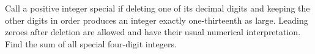 Call a positive integer special if deleting one of its decimal digits and keeping the other digits in order produces an integer exactly one-thirteenth as large. Leading zeroes after deletion are allowed and have their usual numerical interpretation. Find the sum of all special four-digit integers.

